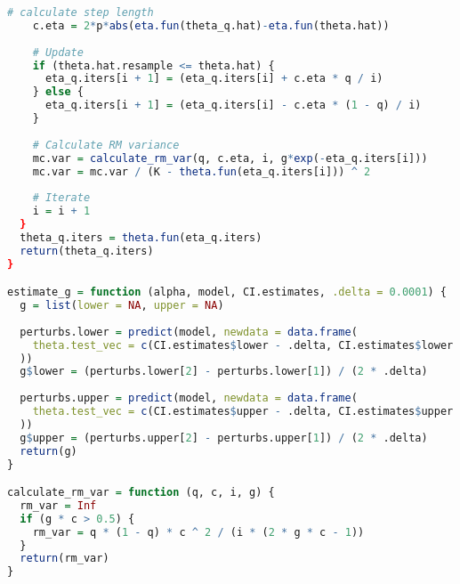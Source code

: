 \begin{lstlisting}[language=R, caption = {Code for implementing SI-RM.}]
    # calculate step length
    c.eta = 2*p*abs(eta.fun(theta_q.hat)-eta.fun(theta.hat))
    
    # Update
    if (theta.hat.resample <= theta.hat) {
      eta_q.iters[i + 1] = (eta_q.iters[i] + c.eta * q / i)
    } else {
      eta_q.iters[i + 1] = (eta_q.iters[i] - c.eta * (1 - q) / i)
    }
    
    # Calculate RM variance
    mc.var = calculate_rm_var(q, c.eta, i, g*exp(-eta_q.iters[i]))
    mc.var = mc.var / (K - theta.fun(eta_q.iters[i])) ^ 2
    
    # Iterate
    i = i + 1
  }
  theta_q.iters = theta.fun(eta_q.iters)
  return(theta_q.iters)
}

estimate_g = function (alpha, model, CI.estimates, .delta = 0.0001) {
  g = list(lower = NA, upper = NA)
  
  perturbs.lower = predict(model, newdata = data.frame(
    theta.test_vec = c(CI.estimates$lower - .delta, CI.estimates$lower + .delta)
  ))
  g$lower = (perturbs.lower[2] - perturbs.lower[1]) / (2 * .delta)
  
  perturbs.upper = predict(model, newdata = data.frame(
    theta.test_vec = c(CI.estimates$upper - .delta, CI.estimates$upper + .delta)
  ))
  g$upper = (perturbs.upper[2] - perturbs.upper[1]) / (2 * .delta)
  return(g)
}

calculate_rm_var = function (q, c, i, g) {
  rm_var = Inf
  if (g * c > 0.5) {
    rm_var = q * (1 - q) * c ^ 2 / (i * (2 * g * c - 1))
  }
  return(rm_var)
}
\end{lstlisting}